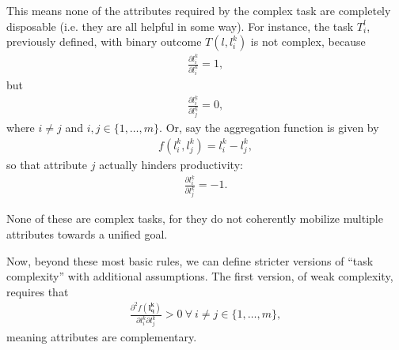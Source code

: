 \documentclass[hidelinks, nonatbib]{elsarticle}
\begin{document}
\begin{definition}
    This means none of the attributes required by the complex task are completely disposable (i.e. they are all helpful in some way). For instance, the task $T_{i}^{l}$, previously defined, with binary outcome $T(l, l_{i}^{k})$ is not complex, because
    \begin{gather}
        \frac{
            \partial
            l_{i}^{k}
        }{
            \partial 
            l_{i}^{k}
        } = 1
        ,
    \end{gather}
    but
    \begin{gather}
        \frac{
            \partial
            l_{i}^{k}
        }{
            \partial 
            l_{j}^{k}
        } = 0
        , 
    \end{gather}
    where $i \neq j$ and $i, j \in \{1, \dots, m\}$. Or, say the aggregation function is given by
    \begin{gather}
        f(l_{i}^{k}, l_{j}^{k}) = 
        l_{i}^{k} - l_{j}^{k}
        ,
    \end{gather}
    so that attribute $j$ actually hinders productivity:
    \begin{gather}
        \frac{
            \partial
            l_{i}^{k}
        }{
            \partial 
            l_{j}^{k}
        } = -1
        .
    \end{gather}
        
    None of these are complex tasks, for they do not coherently mobilize multiple attributes towards a unified goal.
    
    \begin{subdefinition}
        Now, beyond these most basic rules, we can define stricter versions of ``task complexity'' with additional assumptions. The first version, of weak complexity, requires that
        \begin{gather}
            \frac{
                \partial ^ 2 {f(\boldsymbol{l_{q}^{k}})}
            }{
                \partial 
                l_{i}^{k}
                \partial
                l_{j}^{k}
            }
            > 0
            \
            \forall
            \
            i \neq j \in \{1, \dots, m\}
            ,
        \end{gather}
        meaning attributes are complementary.
    \end{subdefinition}
    

\end{definition}
\end{document}
